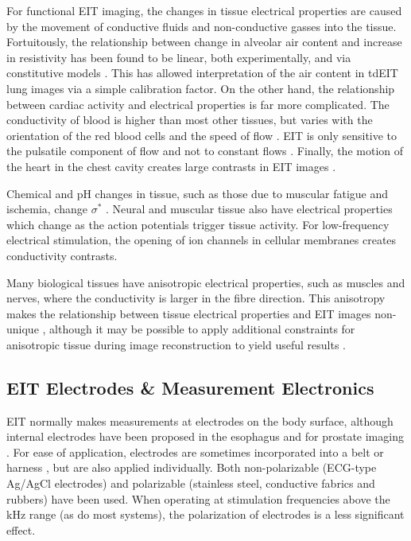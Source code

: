 \documentclass[12pt]{article} \usepackage[margin=3cm]{geometry} \usepackage[margin=20pt,font=small,labelfont=bf]{caption}\def\TBLWIDA{35mm}\def\TBLWIDB{95mm}
\begin{document}
For functional EIT imaging, the changes in tissue
electrical properties are caused by the movement of
conductive fluids and non-conductive gasses into
the tissue. Fortuitously, the relationship between
change in alveolar air content and increase in 
resistivity has been found to be linear, both
experimentally,
 and via constitutive models \cite{Roth2015Correlation}.
This has allowed interpretation of the air 
content in  tdEIT lung images via a simple calibration factor.
On the other hand, the relationship between 
cardiac activity and electrical properties is far
more complicated. The conductivity of blood is 
higher than most other tissues, but varies with
the orientation of the red blood cells and the
speed of flow \cite{Hoetink2004Flow}.
EIT is only sensitive to the
pulsatile component of flow 
and not to constant flows \cite{Frerichs2017Chest}.
Finally, the motion of the heart in the chest cavity
creates large contrasts in EIT images \cite{Proenca2015Motion}.

Chemical and pH changes in tissue, such as those due to
muscular fatigue and ischemia, change $\sigma^*$
\cite{Packham2012Frequency}.
Neural and muscular tissue also have electrical properties
which change as the action potentials trigger tissue activity.
For low-frequency electrical stimulation, the opening of
ion channels in cellular membranes \cite{Aristovich2014Neural}
creates conductivity contrasts. 

Many biological tissues have anisotropic electrical properties,
such as muscles and nerves, where the conductivity
is larger in the fibre direction.
This anisotropy makes the relationship between
tissue electrical properties and EIT images
non-unique \cite{Lee1989Anisotopic}, although
it may be possible to apply additional constraints for
anisotropic tissue
during image reconstruction to yield useful results
 \cite{Lionheart2010Finite}.

\subsection{EIT Electrodes \& Measurement Electronics}


EIT normally makes measurements at electrodes on the body surface,
although internal electrodes have been proposed in the
esophagus \cite{Schuessler1995Esophageal}
 and for prostate imaging \cite{Borsic2009Prostate}.
For ease of application, electrodes are sometimes incorporated into a belt or
harness \cite{Waldmann2017Interface}, but are also applied individually. 
Both non-polarizable (ECG-type Ag/AgCl electrodes) and 
         polarizable (stainless steel, conductive fabrics and rubbers)
have been used. When operating at stimulation frequencies above
the kHz range (as do most systems), the polarization of electrodes is
a less significant effect.
\end{document}
